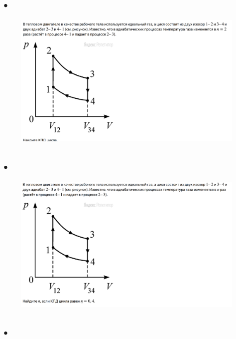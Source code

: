 \documentclass[a4paper,12pt]{article} %
\begin{document}
\subsection{•}

\begin{figure}[H]
\centering
  \includegraphics[width=1.1\linewidth]{4.PNG}
  \label{task2}
\end{figure}

\subsection{•}

\begin{figure}[H]
\centering
  \includegraphics[width=1.1\linewidth]{5.PNG}
  \label{task2}
\end{figure}


\subsection{•}
\end{document}
